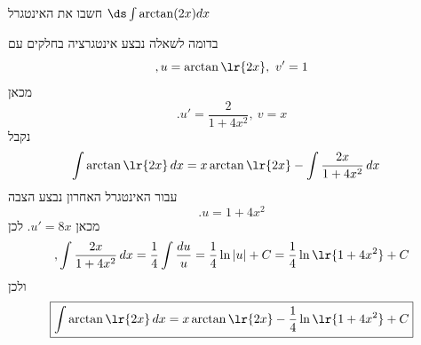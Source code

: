 חשבו את האינטגרל
$\ds \int \arctan(2x)dx$
\begin{solbox}
בדומה לשאלה
נבצע אינטגרציה בחלקים עם $$,u=\arctan\lr{2x},\ v'=1$$
מכאן
$$.u'=\frac{2}{1+4x^2},\ v=x$$
נקבל
\begin{align*}
\int \arctan\lr{2x}\,dx
&=x\arctan\lr{2x}-\int \frac{2x}{1+4x^2}\,dx
\end{align*}
עבור האינטגרל האחרון נבצע הצבה $$.u=1+4x^2$$
מכאן
$u'=8x$.
לכן
\begin{align*}
,\int \frac{2x}{1+4x^2}\,dx=\frac{1}{4}\int\frac{du}{u}=\frac14\ln|u|+C=\frac14\ln\lr{1+4x^2}+C
\end{align*}
ולכן
\begin{align*}
\boxed{\int \arctan\lr{2x}\,dx=x\arctan\lr{2x}-\frac14\ln\lr{1+4x^2}+C}
\end{align*}
\end{solbox}

